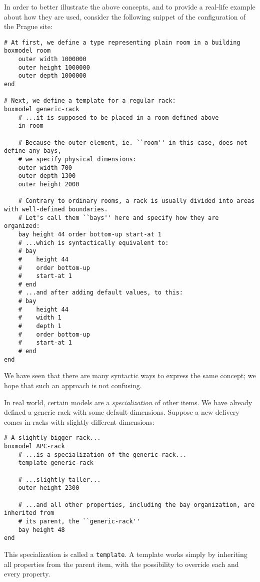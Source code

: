 \documentclass[11pt]{article}
\begin{document}
In order to better illustrate the above concepts, and to provide a real-life
example about how they are used, consider the following snippet of the
configuration of the Prague site:

{\scriptsize
\begin{verbatim}
# At first, we define a type representing plain room in a building
boxmodel room
    outer width 1000000
    outer height 1000000
    outer depth 1000000
end

# Next, we define a template for a regular rack:
boxmodel generic-rack
    # ...it is supposed to be placed in a room defined above
    in room

    # Because the outer element, ie. ``room'' in this case, does not define any bays,
    # we specify physical dimensions:
    outer width 700
    outer depth 1300
    outer height 2000

    # Contrary to ordinary rooms, a rack is usually divided into areas with well-defined boundaries.
    # Let's call them ``bays'' here and specify how they are organized:
    bay height 44 order bottom-up start-at 1
    # ...which is syntactically equivalent to:
    # bay
    #    height 44
    #    order bottom-up
    #    start-at 1
    # end
    # ...and after adding default values, to this:
    # bay
    #    height 44
    #    width 1
    #    depth 1
    #    order bottom-up
    #    start-at 1
    # end
end
\end{verbatim}
}

We have seen that there are many syntactic ways to express the same concept; we
hope that such an approach is not confusing.

In real world, certain models are a {\em specialization} of other items.  We
have already defined a generic rack with some default dimensions.  Suppose a new
delivery comes in racks with slightly different dimensions:

{\scriptsize
\begin{verbatim}
# A slightly bigger rack...
boxmodel APC-rack
    # ...is a specialization of the generic-rack...
    template generic-rack

    # ...slightly taller...
    outer height 2300

    # ...and all other properties, including the bay organization, are inherited from
    # its parent, the ``generic-rack''
    bay height 48
end
\end{verbatim}
}

This specialization is called a {\tt template}.  A template works simply by
inheriting all properties from the parent item, with the possibility to override
each and every property.
\end{document}
